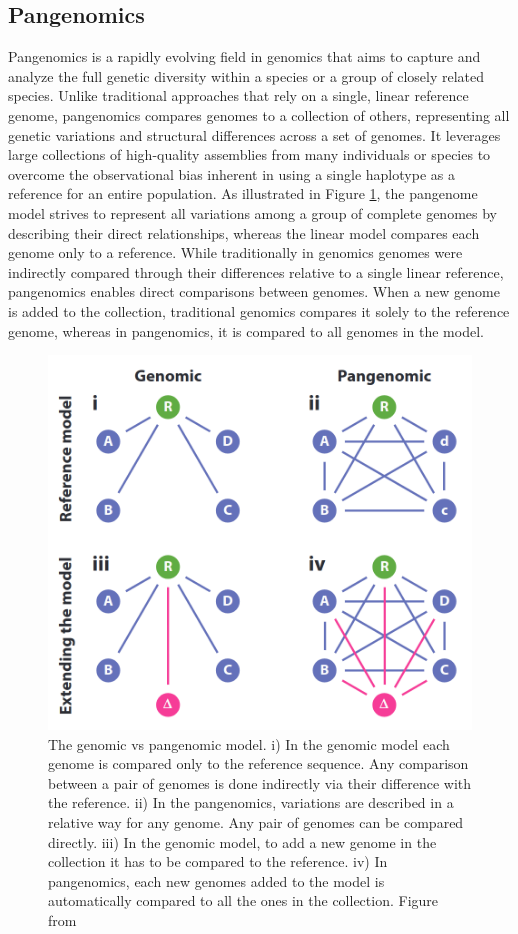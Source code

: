 \subsection{Pangenomics}
Pangenomics is a rapidly evolving field in genomics that aims to capture and analyze the full genetic diversity within a species or a group of closely related species. Unlike traditional approaches that rely on a single, linear reference genome, pangenomics compares genomes to a collection of others, representing all genetic variations and structural differences across a set of genomes. It leverages large collections of high-quality assemblies from many individuals or species to overcome the observational bias inherent in using a single haplotype as a reference for an entire population. As illustrated in Figure \ref{fig:pangenomics_model}, the pangenome model strives to represent all variations among a group of complete genomes by describing their direct relationships, whereas the linear model compares each genome only to a reference. While traditionally in genomics genomes were indirectly compared through their differences relative to a single linear reference, pangenomics enables direct comparisons between genomes. When a new genome is added to the collection, traditional genomics compares it solely to the reference genome, whereas in pangenomics, it is compared to all genomes in the model.
\begin{figure}[h!]
	\centering
	\includegraphics[width=.75\linewidth]{figures/background/pangenome_model.png}
	\caption[The Pangenome model.]{The genomic vs pangenomic model. i) In the genomic model each genome is compared only to the reference sequence. Any comparison between a pair of genomes is done indirectly via their difference with the reference. ii) In the pangenomics, variations are described in a relative way for any genome. Any pair of genomes can be compared directly. iii) In the genomic model, to add a new genome in the collection it has to be compared to the reference. iv) In pangenomics, each new genomes added to the model is automatically compared to all the ones in the collection. Figure from~\cite{eizenga}\\}
	\label{fig:pangenomics_model}
\end{figure}
